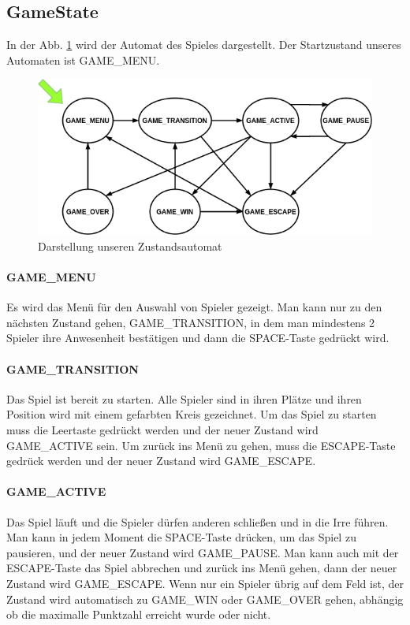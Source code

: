 \documentclass[doktyp=studarbeit]{TUBAFarbeiten}
\begin{document}
\subsection{GameState}

In der Abb. \ref{fig:state-machine} wird der Automat des Spieles dargestellt. 
Der Startzustand unseres Automaten ist GAME\_MENU. 

\begin{figure}
    \centering
    \includegraphics[width=0.7\linewidth]{state_machine.png}
	\caption{Darstellung unseren Zustandsautomat}
	\label{fig:state-machine}
\end{figure}

\paragraph{GAME\_MENU}
Es wird das Menü für den Auswahl von Spieler gezeigt. Man kann nur zu den
nächsten Zustand gehen, GAME\_TRANSITION, in dem man mindestens 2 Spieler
ihre Anwesenheit bestätigen und dann die SPACE-Taste gedrückt wird.
\paragraph{GAME\_TRANSITION}
Das Spiel ist bereit zu starten. Alle Spieler sind in ihren Plätze und ihren
Position wird mit einem gefarbten Kreis gezeichnet. Um das Spiel zu starten
muss die Leertaste gedrückt werden und der neuer Zustand wird GAME\_ACTIVE sein.
Um zurück ins Menü zu gehen, muss die ESCAPE-Taste gedrück werden und der neuer
Zustand wird GAME\_ESCAPE.
\paragraph{GAME\_ACTIVE}
Das Spiel läuft und die Spieler dürfen anderen schließen und in die Irre führen.
Man kann in jedem Moment die SPACE-Taste drücken, um das Spiel zu pausieren,
und der neuer Zustand wird GAME\_PAUSE. Man kann auch mit der ESCAPE-Taste das
Spiel abbrechen und zurück ins Menü gehen, dann der neuer Zustand wird 
GAME\_ESCAPE. Wenn nur ein Spieler übrig auf dem Feld ist, der Zustand wird 
automatisch zu GAME\_WIN oder GAME\_OVER gehen, abhängig ob die maximalle 
Punktzahl erreicht wurde oder nicht.
\end{document}
